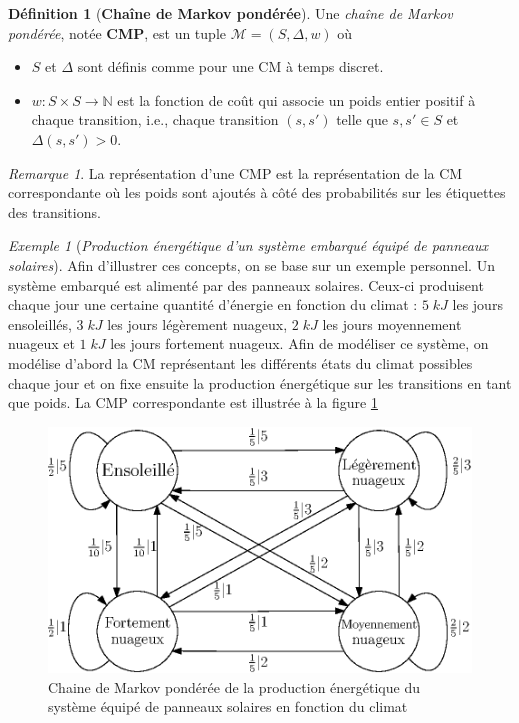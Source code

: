 \documentclass[12pt,a4paper]{report}
\theoremstyle{definition}%
\newtheorem{definition}{Définition}[chapter]
\theoremstyle{remark}
\newtheorem{example}{Exemple}[chapter]
\newtheorem{remark}{Remarque}[chapter]
\newcommand{\ie}{i.e., }
\let\labelitemi\labelitemii
\begin{document}
\begin{definition}[\textbf{Chaîne de Markov pondérée}]
	Une \textit{chaîne de Markov pondérée}, notée \textbf{CMP}, est un tuple $\mathcal{M} = (S, \Delta, w)$ où
	\begin{itemize}
		\renewcommand{\labelitemi}{\tiny$\bullet$}
		\item $S$ et $\Delta$ sont définis comme pour une CM à temps discret.
		\item $w: S\times S \rightarrow \mathbb{N}$ est la fonction de coût qui associe un poids entier positif à chaque  transition, \ie chaque transition $(s, s')$ telle que $s, s' \in S$ et $\Delta(s, s') > 0$.
	\end{itemize}
\end{definition}

\begin{remark}
	La représentation d'une CMP est la représentation de la CM correspondante où les poids sont ajoutés à côté des probabilités sur les étiquettes des transitions.
\end{remark}
\begin{example}[\textit{Production énergétique d'un système embarqué équipé de panneaux solaires}]\label{solar-pannel-example}
Afin d'illustrer ces concepts, on se base sur un exemple personnel.
	Un système embarqué est alimenté par des panneaux solaires. Ceux-ci produisent chaque jour une certaine quantité d'énergie en fonction du climat : $5\; kJ$ les jours ensoleillés, $3\; kJ$ les jours légèrement nuageux, $2\; kJ$ les jours moyennement nuageux et $1\; kJ$ les jours fortement nuageux. Afin de modéliser ce système, on modélise d'abord la CM représentant les différents états du climat possibles chaque jour et on fixe ensuite la production énergétique sur les transitions en tant que poids. La CMP correspondante est illustrée à la figure \ref{solar-pannel-1}

	\begin{figure}[H]
		\centering
		\captionsetup{justification=centering}
		\includegraphics[scale=0.9]{figures/weather-solar-pannel.eps}
		\caption{Chaine de Markov pondérée de la production énergétique du système équipé de panneaux solaires en fonction du climat}
		\label{solar-pannel-1}
	\end{figure}
\end{example}
\end{document}

